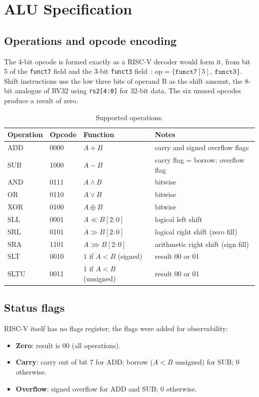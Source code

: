 \documentclass[12pt,a4paper,twoside]{article}
\begin{document}
\section{ALU Specification}

\subsection{Operations and opcode encoding}

The 4-bit opcode is formed exactly as a RISC-V decoder would form it,
from bit 5 of the \texttt{funct7} field and the 3-bit \texttt{funct3}
field~\cite{riscv}: $\text{op} = \{\texttt{funct7}[5],\ \texttt{funct3}\}$. Shift
instructions use the low three bits of operand B as the shift amount, the 8-bit
analogue of RV32 using \texttt{rs2[4:0]} for 32-bit data. The six unused opcodes
produce a result of zero.

\begin{table}[H]
\centering
\caption{Supported operations.}
\label{tab:ops}
\begin{tabular}{@{}llll@{}}
\toprule
\textbf{Operation} & \textbf{Opcode} & \textbf{Function} & \textbf{Notes} \\
\midrule
ADD  & 0000 & $A + B$ & carry and signed overflow flags \\
SUB  & 1000 & $A - B$ & carry flag = borrow; overflow flag \\
AND  & 0111 & $A \land B$ & bitwise \\
OR   & 0110 & $A \lor B$ & bitwise \\
XOR  & 0100 & $A \oplus B$ & bitwise \\
SLL  & 0001 & $A \ll B[2{:}0]$ & logical left shift \\
SRL  & 0101 & $A \gg B[2{:}0]$ & logical right shift (zero fill) \\
SRA  & 1101 & $A \ggg B[2{:}0]$ & arithmetic right shift (sign fill) \\
SLT  & 0010 & $1$ if $A < B$ (signed) & result 00 or 01 \\
SLTU & 0011 & $1$ if $A < B$ (unsigned) & result 00 or 01 \\
\bottomrule
\end{tabular}
\end{table}

\subsection{Status flags}

RISC-V itself has no flags register; the flags were added for
observability:
\begin{itemize}
  \item \textbf{Zero}: result is 00 (all operations).
  \item \textbf{Carry}: carry out of bit 7 for ADD; borrow ($A < B$ unsigned) for
        SUB; 0 otherwise.
  \item \textbf{Overflow}: signed overflow for ADD and SUB;
        0 otherwise.
\end{itemize}
\end{document}
